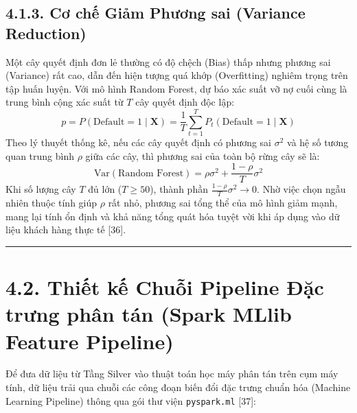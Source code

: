 \documentclass[
  13pt,
  a4paper,
]{report}
\begin{document}
\subsection{4.1.3. Cơ chế Giảm Phương sai (Variance
Reduction)}\label{cux1a1-chux1ebf-giux1ea3m-phux1b0ux1a1ng-sai-variance-reduction}

Một cây quyết định đơn lẻ thường có độ chệch (Bias) thấp nhưng phương
sai (Variance) rất cao, dẫn đến hiện tượng quá khớp (Overfitting) nghiêm
trọng trên tập huấn luyện. Với mô hình Random Forest, dự báo xác suất vỡ
nợ cuối cùng là trung bình cộng xác suất từ \(T\) cây quyết định độc
lập:
\[p = P(\text{Default}=1 \mid \mathbf{X}) = \frac{1}{T} \sum_{t=1}^{T} P_t(\text{Default}=1 \mid \mathbf{X})\]
Theo lý thuyết thống kê, nếu các cây quyết định có phương sai
\(\sigma^2\) và hệ số tương quan trung bình \(\rho\) giữa các cây, thì
phương sai của toàn bộ rừng cây sẽ là:
\[\text{Var}(\text{Random Forest}) = \rho \sigma^2 + \frac{1 - \rho}{T} \sigma^2\]
Khi số lượng cây \(T\) đủ lớn (\(T \ge 50\)), thành phần
\(\frac{1 - \rho}{T} \sigma^2 \rightarrow 0\). Nhờ việc chọn ngẫu nhiên
thuộc tính giúp \(\rho\) rất nhỏ, phương sai tổng thể của mô hình giảm
mạnh, mang lại tính ổn định và khả năng tổng quát hóa tuyệt vời khi áp
dụng vào dữ liệu khách hàng thực tế {[}36{]}.

\begin{center}\rule{0.5\linewidth}{0.5pt}\end{center}

\section{4.2. Thiết kế Chuỗi Pipeline Đặc trưng phân tán (Spark MLlib
Feature
Pipeline)}\label{thiux1ebft-kux1ebf-chuux1ed7i-pipeline-ux111ux1eb7c-trux1b0ng-phuxe2n-tuxe1n-spark-mllib-feature-pipeline}

Để đưa dữ liệu từ Tầng Silver vào thuật toán học máy phân tán trên cụm
máy tính, dữ liệu trải qua chuỗi các công đoạn biến đổi đặc trưng chuẩn
hóa (Machine Learning Pipeline) thông qua gói thư viện
\texttt{pyspark.ml} {[}37{]}:
\end{document}
